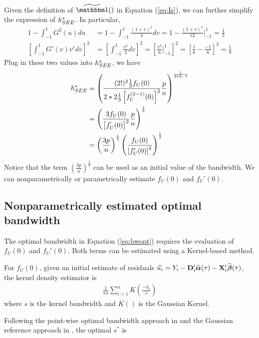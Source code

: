 Given the definition of $\Is()$ in Equation (\ref{eq:Is}), we can further
simplify the expression of $h^*_{SEE}$. In particular,
\begin{align*}
1- \int_{-1}^{1}G^2(u)du 
&= 1 - \int_{-1}^1 \frac{(1 + v)^2}{4}dv = 1 - \frac{(1+v)^3}{12}|_{-1}^{1}
= \frac{1}{3} \\
\left[ \int_{-1}^1 G'(v)v^rdv  \right]^2
&=\left[ \int_{-1}^1 \frac{v^2}{2}dv \right]^2  
= \left[ \frac{v^3}{6}|_{-1}^1 \right]^2
= \left[ \frac{1}{6} - \frac{-1}{6} \right]^2 = \frac{1}{9}
\end{align*}
Plug in these two values into $h^*_{SEE}$, we have
\begin{align}
  h^*_{SEE} & = 
\left(
\frac{(2!)^2 \frac{1}{3}f_U(0)}
{2*2 \frac{1}{9} 
\left[f_U^{(2-1)}(0) \right]^2} \frac{p}{n}\right)^{\frac{1}{2*2 - 1}} \nonumber
\\
&= 
\left(
\frac{3f_U(0)}{\left[f_U^{'}(0) \right]^2} \frac{p}{n}\right)^{\frac{1}{3}} 
\nonumber \\
&= \left( \frac{3p}{n} \right)^{\frac{1}{3}} 
\left(\frac{f_U(0)}{\left[f'_U(0)\right]^2} \right)^{\frac{1}{3}}
\label{eq:bwopt}
\end{align}
Notice that the term $\left( \frac{3p}{n} \right)^{\frac{1}{3}}$ can be used as
an initial value of the bandwidth. We can nonparametrically or parametrically
estimate $f_U(0)$ and $f_U'(0)$. 

\subsection{Nonparametrically estimated optimal bandwidth}
The optimal bandwidth in Equation (\ref{eq:bwopt}) requires the evaluation of
$f_U(0)$ and $f_U'(0)$. Both terms can be estimated using a Kernel-based method.

For $f_U(0)$, given an initial estimate of residuals $\widehat{u_i} = Y_i 
-\mathbf{D}_i'\widehat{\boldsymbol{\alpha}}(\tau) -\mathbf{X}_i'\widehat{\boldsymbol{\beta}}(\tau)$, the kernel density
estimator is 
\begin{align}
  \frac{1}{ns}\sum_{i=1}^n K(\frac{-\hat{u}_i}{s})
\end{align}
where $s$ is the kernel bandwidth and $K()$ is the Gaussian Kernel.

Following the point-wise optimal bandwidth approach in \cite{DasGupta2008} and the
Gaussian reference approach in \cite{Silverman1998}, the optimal $s^*$ is


